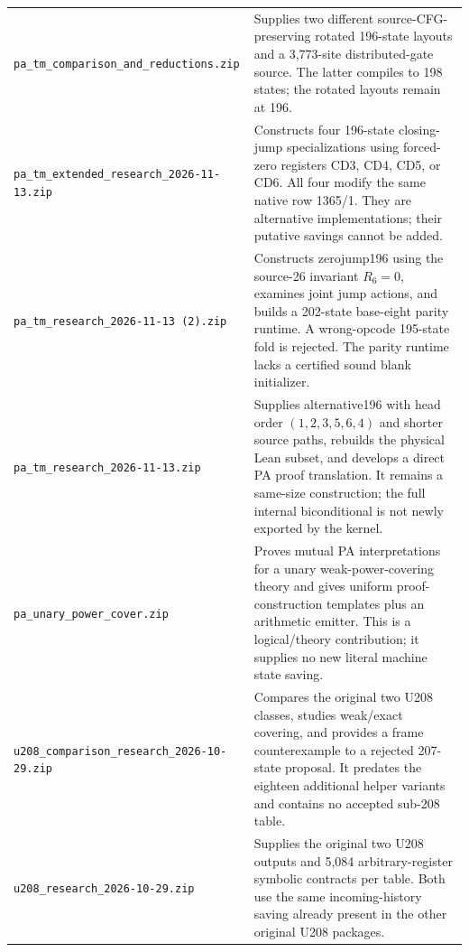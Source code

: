 \begin{longtable}{@{}>{\raggedright\arraybackslash}p{}@{\hspace{.035\textwidth}}>{\raggedright\arraybackslash}p{}@{}}
\nolinkurl{pa_tm_comparison_and_reductions.zip}
& Supplies two different source-CFG-preserving rotated 196-state layouts and
a 3,773-site distributed-gate source. The latter compiles to 198 states;
the rotated layouts remain at 196.\\[.7ex]

\nolinkurl{pa_tm_extended_research_2026-11-13.zip}
& Constructs four 196-state closing-jump specializations using forced-zero
registers CD3, CD4, CD5, or CD6. All four modify the same native row 1365/1.
They are alternative implementations; their putative savings cannot be added.\\[.7ex]

\nolinkurl{pa_tm_research_2026-11-13 (2).zip}
& Constructs zerojump196 using the source-26 invariant $R_6=0$, examines joint
jump actions, and builds a 202-state base-eight parity runtime. A wrong-opcode
195-state fold is rejected. The parity runtime lacks a certified sound blank
initializer.\\[.7ex]

\nolinkurl{pa_tm_research_2026-11-13.zip}
& Supplies alternative196 with head order $(1,2,3,5,6,4)$ and shorter source
paths, rebuilds the physical Lean subset, and develops a direct PA proof
translation. It remains a same-size construction; the full internal
biconditional is not newly exported by the kernel.\\[.7ex]

\nolinkurl{pa_unary_power_cover.zip}
& Proves mutual PA interpretations for a unary weak-power-covering theory and
gives uniform proof-construction templates plus an arithmetic emitter. This is
a logical/theory contribution; it supplies no new literal machine state saving.\\[.7ex]

\nolinkurl{u208_comparison_research_2026-10-29.zip}
& Compares the original two U208 classes, studies weak/exact covering, and
provides a frame counterexample to a rejected 207-state proposal. It predates
the eighteen additional helper variants and contains no accepted sub-208 table.\\[.7ex]

\nolinkurl{u208_research_2026-10-29.zip}
& Supplies the original two U208 outputs and 5,084 arbitrary-register symbolic
contracts per table. Both use the same incoming-history saving already present
in the other original U208 packages.\\

\end{longtable}
\endgroup

